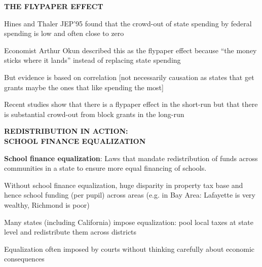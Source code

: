 \documentclass[landscape]{slides}
\begin{document}
\begin{slide}
\begin{center}
{\bf THE FLYPAPER EFFECT}
\end{center}

Hines and Thaler JEP'95 found that the crowd-out of state spending by federal spending is low and often close to zero

Economist Arthur Okun described this as the flypaper effect because ``the money sticks where it lands'' instead of replacing state spending

But evidence is based on correlation [not necessarily causation as states that get grants maybe the ones that like spending the most]

%
%
%
%

Recent studies show that there is a flypaper effect in the short-run but that there is substantial crowd-out
from block grants in the long-run


\end{slide}

\begin{slide}
\begin{center}
{\bf REDISTRIBUTION IN ACTION: \\ SCHOOL FINANCE EQUALIZATION}
\end{center}

{\bf School finance equalization}:
Laws that mandate redistribution of funds across communities in a state to ensure more equal financing of schools.

Without school finance equalization, huge disparity in property tax base and hence school funding (per pupil) across areas
(e.g. in Bay Area: Lafayette is very wealthy, Richmond is poor)

Many states (including California) impose equalization: pool local taxes at state level and redistribute them across
districts

Equalization often imposed by courts without thinking carefully about
economic consequences


\end{slide}
\end{document}
